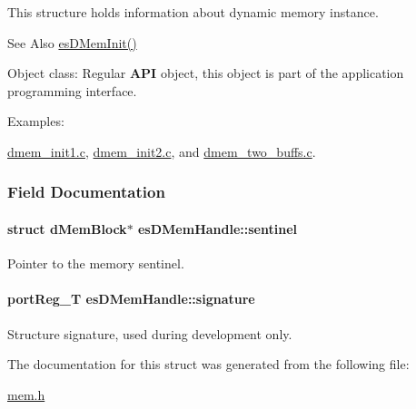 This structure holds information about dynamic memory instance. \begin{DoxySeeAlso}{See Also}
\hyperlink{group__mem__intf_ga10ef80121c0c742b9ad81f24eff91c7f}{es\-D\-Mem\-Init()} 
\end{DoxySeeAlso}
\begin{DoxyParagraph}{Object class\-:}
Regular {\bfseries A\-P\-I} object, this object is part of the application programming interface. 
\end{DoxyParagraph}
\begin{Desc}
\item[Examples\-: ]\par
\hyperlink{dmem_init1_8c-example}{dmem\-\_\-init1.\-c}, \hyperlink{dmem_init2_8c-example}{dmem\-\_\-init2.\-c}, and \hyperlink{dmem_two_buffs_8c-example}{dmem\-\_\-two\-\_\-buffs.\-c}.\end{Desc}


\subsubsection{Field Documentation}
\hypertarget{structesDMemHandle_a64c2d859ebf90e27873f20e1cbbc3bb8}{
\paragraph[{sentinel}]{\setlength{\rightskip}{0pt plus 5cm}struct d\-Mem\-Block$\ast$ es\-D\-Mem\-Handle\-::sentinel}}\label{structesDMemHandle_a64c2d859ebf90e27873f20e1cbbc3bb8}


Pointer to the memory sentinel. 

\hypertarget{structesDMemHandle_a471b42b8a335144bbb79ab89c0c3d170}{
\paragraph[{signature}]{\setlength{\rightskip}{0pt plus 5cm}port\-Reg\-\_\-\-T es\-D\-Mem\-Handle\-::signature}}\label{structesDMemHandle_a471b42b8a335144bbb79ab89c0c3d170}


Structure signature, used during development only. 



The documentation for this struct was generated from the following file\-:\begin{DoxyCompactItemize}
\item 
\hyperlink{mem_8h}{mem.\-h}\end{DoxyCompactItemize}
